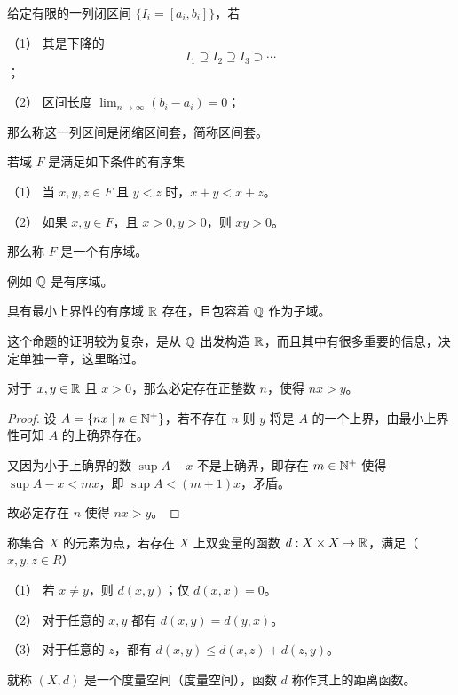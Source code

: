 \begin{definition}[闭区间套]
	给定有限的一列闭区间 $\{ I_i = [a_i, b_i] \}$，若
	
	（1） 其是下降的
	\[ I_1 \supseteq I_2  \supseteq I_3  \supset \cdots \]；

	（2） 区间长度 $\lim_{n \to \infty} (b_i - a_i) = 0$；

	那么称这一列区间是闭缩区间套，简称区间套。
\end{definition}

\begin{definition}[有序域]
	若域 $F$ 是满足如下条件的有序集

	（1） 当 $x,y,z\in F$ 且 $y<z$ 时，$x+y<x+z$。

	（2） 如果 $x,y\in F$，且 $x>0,y>0$，则 $xy>0$。

	那么称 $F$ 是一个有序域。
\end{definition}

例如 $\mathbb{Q}$ 是有序域。

\begin{theorem}[存在定理]
	具有最小上界性的有序域 $\mathbb{R}$ 存在，且包容着 $\mathbb{Q}$ 作为子域。
\end{theorem}

这个命题的证明较为复杂，是从 $\mathbb{Q}$ 出发构造 $\mathbb{R}$，而且其中有很多重要的信息，决定单独一章，这里略过。

\begin{theorem}[Achimedes 原理]
	对于 $x,y \in \mathbb{R}$ 且 $x>0$，那么必定存在正整数 $n$，使得 $nx>y$。
\end{theorem}
\begin{proof}
	设 $A = \{nx \mid n \in \mathbb{N}^+ \}$，若不存在 $n$ 则 $y$ 将是 $A$ 的一个上界，由最小上界性可知 $A$ 的上确界存在。

	又因为小于上确界的数 $\sup A-x$ 不是上确界，即存在 $m\in \mathbb{N}^+$ 使得 $\sup A -x <mx$，即 $\sup A < (m+1)x$，矛盾。

	故必定存在 $n$ 使得 $nx>y$。
\end{proof}

\begin{definition}[度量空间]
	称集合 $X$ 的元素为点，若存在 $X$ 上双变量的函数 $d:X \times X \to \mathbb{R}$，满足（$x,y,z\in R$）

	（1） 若 $x\ne y$，则 $d(x,y)$；仅 $d(x,x)=0$。

	（2） 对于任意的 $x,y$ 都有 $d(x,y) = d(y,x)$。

	（3） 对于任意的 $z$，都有 $d(x,y) \leqslant d(x,z) + d(z,y)$。

	就称 $(X,d)$ 是一个度量空间（度量空间），函数 $d$ 称作其上的距离函数。
\end{definition}

